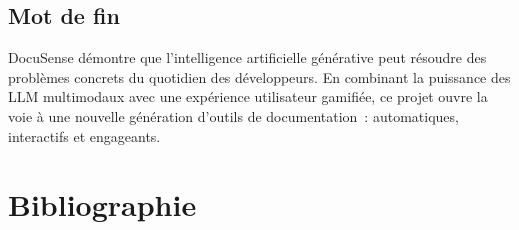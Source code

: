\documentclass[12pt, a4paper, twoside, openany]{report}
\begin{document}
\section*{Mot de fin}

DocuSense d\'emontre que l'intelligence artificielle g\'en\'erative peut r\'esoudre
des probl\`emes concrets du quotidien des d\'eveloppeurs. En combinant la puissance
des LLM multimodaux avec une exp\'erience utilisateur gamifi\'ee, ce projet ouvre
la voie \`a une nouvelle g\'en\'eration d'outils de documentation~: automatiques,
interactifs et engageants.

\clearpage
\chapter*{Bibliographie}
\end{document}
